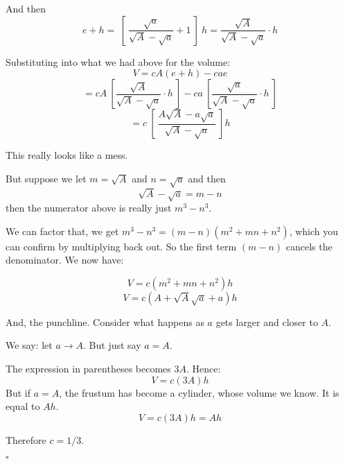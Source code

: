 \documentclass[11pt, oneside]{article}
\begin{document}
And then
\[ e + h = \ [ \  \frac{\sqrt{a}}{\sqrt{A} - \sqrt{a}} + 1 \ ] \ h =\frac{\sqrt{A}}{\sqrt{A} - \sqrt{a}} \cdot h \]

Substituting into what we had above for the volume:
\[ V = cA(e+h) - cae \]
\[ = cA \ [ \frac{\sqrt{A}}{\sqrt{A} - \sqrt{a}} \cdot h \ ] - ca \ [ \frac{\sqrt{a}}{\sqrt{A} - \sqrt{a}}  \cdot h \ ] \]
\[ = c \ [ \   \frac{A \sqrt{A} - a \sqrt{a}}{\sqrt{A} - \sqrt{a}} \ ] h \]

This really looks like a mess.  

But suppose we let $m =  \sqrt{A}$ and $n =  \sqrt{a}$ and then
\[ \sqrt{A} - \sqrt{a} = m - n \]
then the numerator above is really just $m^3 - n^3$.    

We can factor that, we get $m^3 - n^3 = (m-n)(m^2 + mn + n^2)$, which you can confirm by multiplying back out.  So the first term $(m-n)$ cancels the denominator.  We now have:

\[ V = c (m^2 + mn + n^2) h \]
\[ V = c (A + \sqrt{A} \sqrt{a} + a) h \]

And, the punchline.  Consider what happens as $a$ gets larger and closer to $A$.

We say:  let $a \rightarrow A$.  But just say $a = A$.

The expression in parentheses becomes $3A$.  Hence:
\[ V = c(3A)h \]
But if $a = A$, the frustum has become a cylinder, whose volume we know.  It is equal to $Ah$. 
\[ V = c(3A)h = Ah \]

Therefore $c = 1/3$.

$\square$
\end{document}
